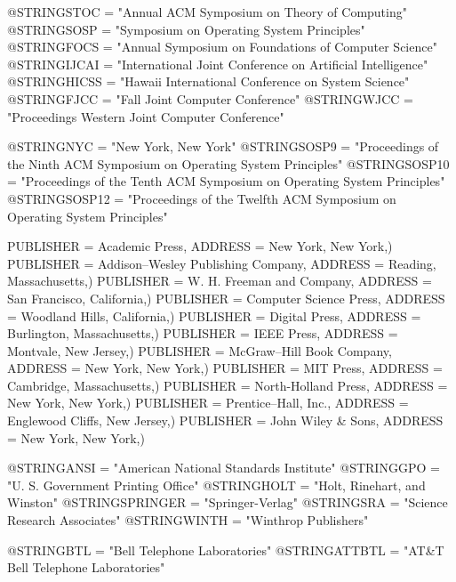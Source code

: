 @STRING{STOC = "Annual ACM Symposium on Theory of Computing"}
@STRING{SOSP = "Symposium on Operating System Principles"}
@STRING{FOCS = "Annual Symposium on Foundations of Computer Science"}
@STRING{IJCAI = "International Joint Conference on Artificial Intelligence"}
@STRING{HICSS = "Hawaii International Conference on System Science"}
@STRING{FJCC = "Fall Joint Computer Conference"}
@STRING{WJCC = "Proceedings Western Joint Computer Conference"}

@STRING{NYC = "New York, New York"}
@STRING{SOSP9 = "Proceedings of the Ninth ACM Symposium on Operating System Principles"}
@STRING{SOSP10 = "Proceedings of the Tenth ACM Symposium on Operating System Principles"}
@STRING{SOSP12 = "Proceedings of the Twelfth ACM Symposium on Operating System Principles"}


    PUBLISHER = {Academic Press},
    ADDRESS = {New York, New York},)
    PUBLISHER = {Addison--Wesley Publishing Company},
    ADDRESS = {Reading, Massachusetts},)
    PUBLISHER = {W. H. Freeman and Company},
    ADDRESS = {San Francisco, California},)
    PUBLISHER = {Computer Science Press},
    ADDRESS = {Woodland Hills, California},)
    PUBLISHER = {Digital Press},
    ADDRESS = {Burlington, Massachusetts},)        
    PUBLISHER = {IEEE Press},
    ADDRESS = {Montvale, New Jersey},)
    PUBLISHER = {McGraw--Hill Book Company},
    ADDRESS = {New York, New York},)
    PUBLISHER = {MIT Press},
    ADDRESS = {Cambridge, Massachusetts},)
    PUBLISHER = {North-Holland Press},
    ADDRESS = {New York, New York},)
    PUBLISHER = {Prentice--Hall, Inc.},
    ADDRESS = {Englewood Cliffs, New Jersey},)
    PUBLISHER = {John Wiley \& Sons},
    ADDRESS = {New York, New York},)

%

@STRING{ANSI = "American National Standards Institute"}
@STRING{GPO = "U. S. Government Printing Office"}
@STRING{HOLT = "Holt, Rinehart, and Winston"}
@STRING{SPRINGER = "Springer-Verlag"}
@STRING{SRA = "Science Research Associates"}
@STRING{WINTH = "Winthrop Publishers"}


@STRING{BTL = "Bell Telephone Laboratories"}
@STRING{ATTBTL = "AT\&T Bell Telephone Laboratories"}

